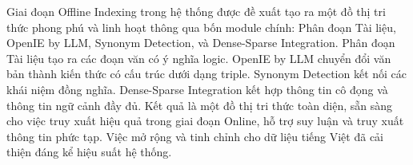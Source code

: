 Giai đoạn Offline Indexing trong hệ thống được đề xuất tạo ra một đồ thị tri thức phong phú và linh hoạt thông qua bốn module chính: Phân đoạn Tài liệu, OpenIE by LLM, Synonym Detection, và Dense-Sparse Integration. Phân đoạn Tài liệu tạo ra các đoạn văn có ý nghĩa logic. OpenIE by LLM chuyển đổi văn bản thành kiến thức có cấu trúc dưới dạng triple. Synonym Detection kết nối các khái niệm đồng nghĩa. Dense-Sparse Integration kết hợp thông tin cô đọng và thông tin ngữ cảnh đầy đủ. Kết quả là một đồ thị tri thức toàn diện, sẵn sàng cho việc truy xuất hiệu quả trong giai đoạn Online, hỗ trợ suy luận và truy xuất thông tin phức tạp. Việc mở rộng và tinh chỉnh cho dữ liệu tiếng Việt đã cải thiện đáng kể hiệu suất hệ thống.
